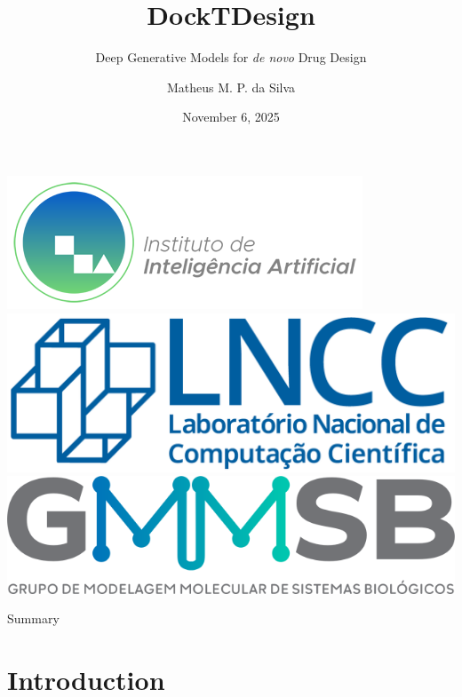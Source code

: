 \documentclass[aspectratio=169,xcolor=dvipsnames]{beamer}
\title{\textbf{DockTDesign}}
\subtitle{\Large Deep Generative Models for \textit{de novo} Drug Design}
\author{Matheus M. P. da Silva}
\institute
{
    PhD in Computational Modeling \\
    Laboratório Nacional de Computação Científica (LNCC/MCTI) \\
    \vspace{0.5em}
    {\faEnvelopeO} \texttt{matheusp@posgrad.lncc.br} \quad {\faGithub} \texttt{\href{https://github.com/mpds}{github.com/mpds}}
}
\date{November 6, 2025}
\begin{document}
\begin{frame}
    \begin{center}
        \includegraphics[height=1.cm]{imgs/logos/logo-instituto-ia.png}
        \hspace{1.cm}
        \includegraphics[height=1.cm]{imgs/logos/lncc-logo.png}
        \hspace{1.cm}
        \includegraphics[height=1.cm]{imgs/logos/gmmsb-logo.png}
    \end{center}
    \vspace{-5em}

    \titlepage
\end{frame}

\begin{frame}{Summary}

    \tableofcontents
\end{frame}





\section{Introduction}
\end{document}

